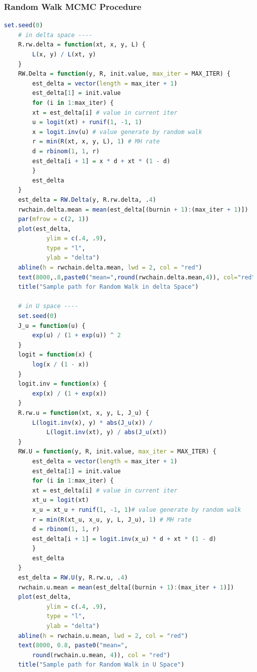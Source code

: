 \documentclass[11pt]{article}
\begin{document}
\subsubsection{Random Walk MCMC Procedure}\label{sec:mhrw}
\begin{lstlisting}[language=R]
    set.seed(0)
    # in delta space ----
    R.rw.delta = function(xt, x, y, L) {
        L(x, y) / L(xt, y)
    }
    RW.Delta = function(y, R, init.value, max_iter = MAX_ITER) {
        est_delta = vector(length = max_iter + 1)
        est_delta[1] = init.value
        for (i in 1:max_iter) {
        xt = est_delta[i] # value in current iter
        u = logit(xt) + runif(1, -1, 1)
        x = logit.inv(u) # value generate by random walk
        r = min(R(xt, x, y, L), 1) # MH rate
        d = rbinom(1, 1, r)
        est_delta[i + 1] = x * d + xt * (1 - d)
        }
        est_delta
    }
    est_delta = RW.Delta(y, R.rw.delta, .4)
    rwchain.delta.mean = mean(est_delta[(burnin + 1):(max_iter + 1)])
    par(mfrow = c(2, 1))
    plot(est_delta,
            ylim = c(.4, .9),
            type = "l",
            ylab = "delta")
    abline(h = rwchain.delta.mean, lwd = 2, col = "red")
    text(8000,.8,paste0("mean=",round(rwchain.delta.mean,4)), col="red")
    title("Sample path for Random Walk in delta Space")

    # in U space ----
    set.seed(0)
    J_u = function(u) {
        exp(u) / (1 + exp(u)) ^ 2
    }
    logit = function(x) {
        log(x / (1 - x))
    }
    logit.inv = function(x) {
        exp(x) / (1 + exp(x))
    }
    R.rw.u = function(xt, x, y, L, J_u) {
        L(logit.inv(x), y) * abs(J_u(x)) / 
            L(logit.inv(xt), y) / abs(J_u(xt))
    }
    RW.U = function(y, R, init.value, max_iter = MAX_ITER) {
        est_delta = vector(length = max_iter + 1)
        est_delta[1] = init.value
        for (i in 1:max_iter) {
        xt = est_delta[i] # value in current iter
        xt_u = logit(xt)
        x_u = xt_u + runif(1, -1, 1)# value generate by random walk
        r = min(R(xt_u, x_u, y, L, J_u), 1) # MH rate
        d = rbinom(1, 1, r)
        est_delta[i + 1] = logit.inv(x_u) * d + xt * (1 - d)
        }
        est_delta
    }
    est_delta = RW.U(y, R.rw.u, .4)
    rwchain.u.mean = mean(est_delta[(burnin + 1):(max_iter + 1)])
    plot(est_delta,
            ylim = c(.4, .9),
            type = "l",
            ylab = "delta")
    abline(h = rwchain.u.mean, lwd = 2, col = "red")
    text(8000, 0.8, paste0("mean=", 
        round(rwchain.u.mean, 4)), col = "red")
    title("Sample path for Random Walk in U Space")
\end{lstlisting}
\end{document}
